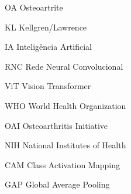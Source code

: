 \documentclass[
	12pt,					%
	openright,				%
	twoside,					%
	a4paper,					%
	english,					%
	brazil,					%
	]{abntex2}
\begin{document}
\frenchspacing

\pretextual



\imprimirfolhaderosto*

% 







% 



\listoffigures*
\cleardoublepage

\listoftables*
\cleardoublepage

\begin{siglas}
  \item[OA] Osteoartrite
  \item[KL] Kellgren/Lawrence
  \item[IA] Inteligência Artificial
  \item[RNC] Rede Neural Convolucional
  \item[ViT] Vision Transformer
  \item[WHO] World Health Organization
  \item[OAI] Osteoarthritis Initiative
  \item[NIH] National Institutes of Health
  \item[CAM] Class Activation Mapping
  \item[GAP] Global Average Pooling
\end{siglas}

\end{document}
